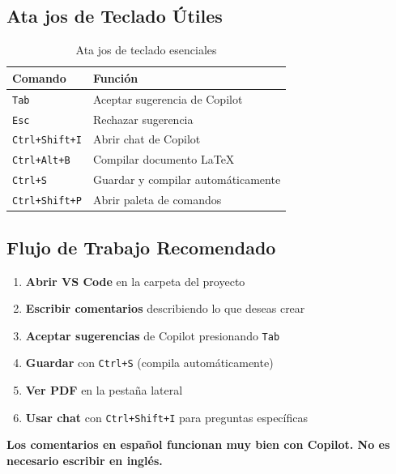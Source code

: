 \documentclass[11pt,a4paper]{article}
\newcommand{\tip}[1]{\textcolor{azulprofundo}{\textbf{\faLightbulb[regular] #1}}}
\newcommand{\comando}[1]{\textcolor{azulprofundo}{\texttt{#1}}}
\begin{document}
	\subsection{Ata jos de Teclado Útiles}
	
	\begin{table}[H]
		\centering
		\begin{tabular}{@{}ll@{}}
			\toprule
			\textbf{Comando} & \textbf{Función} \\
			\midrule
			\comando{Tab} & Aceptar sugerencia de Copilot \\
			\comando{Esc} & Rechazar sugerencia \\
			\comando{Ctrl+Shift+I} & Abrir chat de Copilot \\
			\comando{Ctrl+Alt+B} & Compilar documento LaTeX \\
			\comando{Ctrl+S} & Guardar y compilar automáticamente \\
			\comando{Ctrl+Shift+P} & Abrir paleta de comandos \\
			\bottomrule
		\end{tabular}
		\caption{Ata jos de teclado esenciales}
		\label{tab:atajos}
	\end{table}
	
	\subsection{Flujo de Trabajo Recomendado}
	
	\begin{enumerate}
		\item \textbf{Abrir VS Code} en la carpeta del proyecto
		\item \textbf{Escribir comentarios} describiendo lo que deseas crear
		\item \textbf{Aceptar sugerencias} de Copilot presionando \comando{Tab}
		\item \textbf{Guardar} con \comando{Ctrl+S} (compila automáticamente)
		\item \textbf{Ver PDF} en la pestaña lateral
		\item \textbf{Usar chat} con \comando{Ctrl+Shift+I} para preguntas específicas
	\end{enumerate}
	
\tip{Los comentarios en español funcionan muy bien con Copilot. No es necesario escribir en inglés.}
	
	\newpage
	
	
\end{document}
